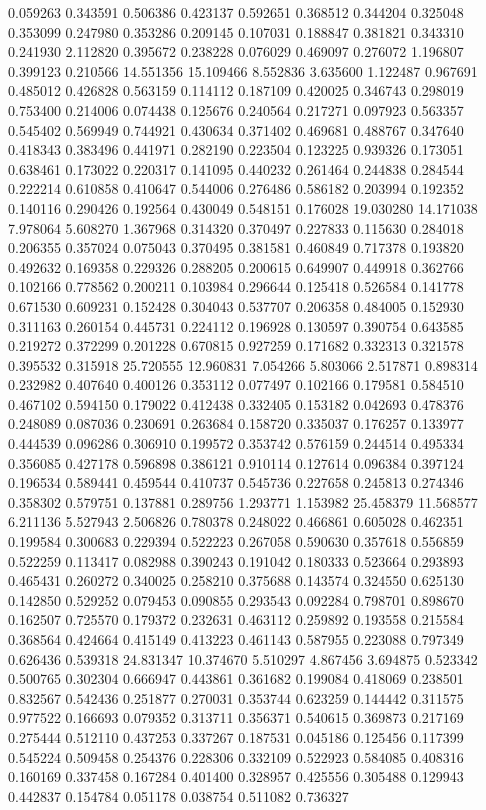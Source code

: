 0.059263
0.343591
0.506386
0.423137
0.592651
0.368512
0.344204
0.325048
0.353099
0.247980
0.353286
0.209145
0.107031
0.188847
0.381821
0.343310
0.241930
2.112820
0.395672
0.238228
0.076029
0.469097
0.276072
1.196807
0.399123
0.210566
14.551356
15.109466
8.552836
3.635600
1.122487
0.967691
0.485012
0.426828
0.563159
0.114112
0.187109
0.420025
0.346743
0.298019
0.753400
0.214006
0.074438
0.125676
0.240564
0.217271
0.097923
0.563357
0.545402
0.569949
0.744921
0.430634
0.371402
0.469681
0.488767
0.347640
0.418343
0.383496
0.441971
0.282190
0.223504
0.123225
0.939326
0.173051
0.638461
0.173022
0.220317
0.141095
0.440232
0.261464
0.244838
0.284544
0.222214
0.610858
0.410647
0.544006
0.276486
0.586182
0.203994
0.192352
0.140116
0.290426
0.192564
0.430049
0.548151
0.176028
19.030280
14.171038
7.978064
5.608270
1.367968
0.314320
0.370497
0.227833
0.115630
0.284018
0.206355
0.357024
0.075043
0.370495
0.381581
0.460849
0.717378
0.193820
0.492632
0.169358
0.229326
0.288205
0.200615
0.649907
0.449918
0.362766
0.102166
0.778562
0.200211
0.103984
0.296644
0.125418
0.526584
0.141778
0.671530
0.609231
0.152428
0.304043
0.537707
0.206358
0.484005
0.152930
0.311163
0.260154
0.445731
0.224112
0.196928
0.130597
0.390754
0.643585
0.219272
0.372299
0.201228
0.670815
0.927259
0.171682
0.332313
0.321578
0.395532
0.315918
25.720555
12.960831
7.054266
5.803066
2.517871
0.898314
0.232982
0.407640
0.400126
0.353112
0.077497
0.102166
0.179581
0.584510
0.467102
0.594150
0.179022
0.412438
0.332405
0.153182
0.042693
0.478376
0.248089
0.087036
0.230691
0.263684
0.158720
0.335037
0.176257
0.133977
0.444539
0.096286
0.306910
0.199572
0.353742
0.576159
0.244514
0.495334
0.356085
0.427178
0.596898
0.386121
0.910114
0.127614
0.096384
0.397124
0.196534
0.589441
0.459544
0.410737
0.545736
0.227658
0.245813
0.274346
0.358302
0.579751
0.137881
0.289756
1.293771
1.153982
25.458379
11.568577
6.211136
5.527943
2.506826
0.780378
0.248022
0.466861
0.605028
0.462351
0.199584
0.300683
0.229394
0.522223
0.267058
0.590630
0.357618
0.556859
0.522259
0.113417
0.082988
0.390243
0.191042
0.180333
0.523664
0.293893
0.465431
0.260272
0.340025
0.258210
0.375688
0.143574
0.324550
0.625130
0.142850
0.529252
0.079453
0.090855
0.293543
0.092284
0.798701
0.898670
0.162507
0.725570
0.179372
0.232631
0.463112
0.259892
0.193558
0.215584
0.368564
0.424664
0.415149
0.413223
0.461143
0.587955
0.223088
0.797349
0.626436
0.539318
24.831347
10.374670
5.510297
4.867456
3.694875
0.523342
0.500765
0.302304
0.666947
0.443861
0.361682
0.199084
0.418069
0.238501
0.832567
0.542436
0.251877
0.270031
0.353744
0.623259
0.144442
0.311575
0.977522
0.166693
0.079352
0.313711
0.356371
0.540615
0.369873
0.217169
0.275444
0.512110
0.437253
0.337267
0.187531
0.045186
0.125456
0.117399
0.545224
0.509458
0.254376
0.228306
0.332109
0.522923
0.584085
0.408316
0.160169
0.337458
0.167284
0.401400
0.328957
0.425556
0.305488
0.129943
0.442837
0.154784
0.051178
0.038754
0.511082
0.736327
